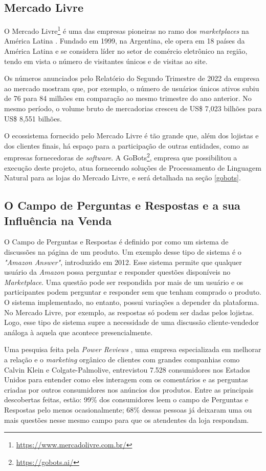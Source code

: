 \subsection{Mercado Livre}
O Mercado Livre\footnote{\url{https://www.mercadolivre.com.br/}} é uma das empresas pioneiras no ramo dos \textit{marketplaces} na América Latina \cite{ml}. Fundado em 1999, na Argentina, ele opera em 18 países da América Latina e se considera líder no setor de comércio eletrônico na região, tendo em vista o número de visitantes únicos e de visitas ao site.

Os números anunciados pelo Relatório do Segundo Trimestre de 2022 \cite{ml_report} da empresa ao mercado mostram que, por exemplo, o número de usuários únicos ativos subiu de 76 para 84 milhões em comparação ao mesmo trimestre do ano anterior. No mesmo período, o volume bruto de mercadorias cresceu de US\$ 7,023 bilhões para US\$ 8,551 bilhões.

O ecossistema fornecido pelo Mercado Livre é tão grande que, além dos lojistas e dos clientes finais, há espaço para a participação de outras entidades, como as empresas fornecedoras de \textit{software}. A GoBots\footnote{\label{gb}\url{https://gobots.ai/}}, empresa que possibilitou a execução deste projeto, atua fornecendo soluções de Processamento de Linguagem Natural para as lojas do Mercado Livre, e será detalhada na seção \ref{gobots}.


\subsection{O Campo de Perguntas e Respostas e a sua Influência na Venda}
O Campo de Perguntas e Respostas é definido por \cite{qna_field} como um sistema de discussões na página de um produto. Um exemplo desse tipo de sistema é o \textit{"Amazon Answer"}, introduzido em 2012. Esse sistema permite que qualquer usuário da \textit{Amazon} possa perguntar e responder questões disponíveis no \textit{Marketplace}. Uma questão pode ser respondida por mais de um usuário e os participantes podem perguntar e responder sem que tenham comprado o produto. O sistema implementado, no entanto, possui variações a depender da plataforma. No Mercado Livre, por exemplo, as respostas só podem ser dadas pelos lojistas. Logo, esse tipo de sistema supre a necessidade de uma discussão cliente-vendedor análoga à aquela que acontece presencialmente.

Uma pesquisa feita pela \textit{Power Reviews} \cite{qna_survey}, uma empresa especializada em melhorar a relação e o \textit{marketing} orgânico de clientes com grandes companhias como Calvin Klein e Colgate-Palmolive, entrevistou 7.528 consumidores nos Estados Unidos para entender como eles interagem com os comentários e as perguntas criadas por outros consumidores nos anúncios dos produtos. Entre as principais descobertas feitas, estão: 99\% dos consumidores leem o campo de Perguntas e Respostas pelo menos ocasionalmente; 68\% dessas pessoas já deixaram uma ou mais questões nesse mesmo campo para que os atendentes da loja respondam.

